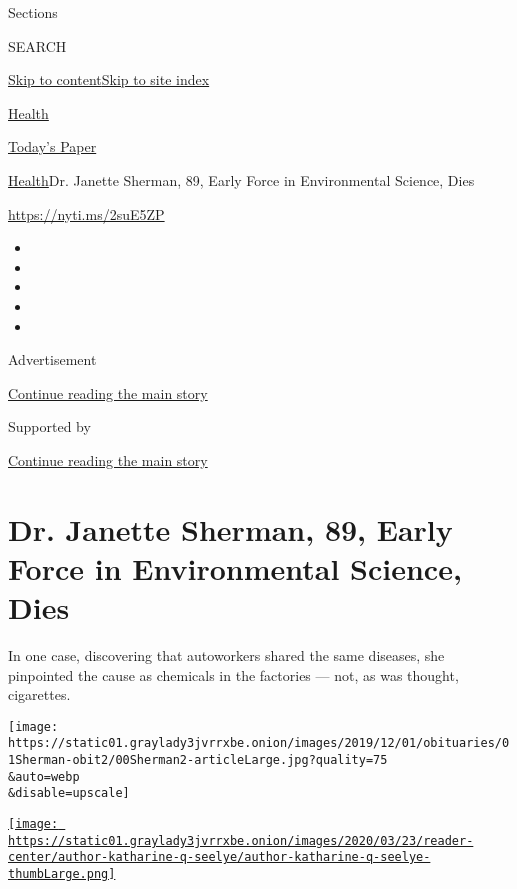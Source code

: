 Sections

SEARCH

\protect\hyperlink{site-content}{Skip to
content}\protect\hyperlink{site-index}{Skip to site index}

\href{https://www.nytimes3xbfgragh.onion/section/health}{Health}

\href{https://myaccount.nytimes3xbfgragh.onion/auth/login?response_type=cookie\&client_id=vi}{}

\href{https://www.nytimes3xbfgragh.onion/section/todayspaper}{Today's
Paper}

\href{/section/health}{Health}\textbar{}Dr. Janette Sherman, 89, Early
Force in Environmental Science, Dies

\url{https://nyti.ms/2suE5ZP}

\begin{itemize}
\item
\item
\item
\item
\item
\end{itemize}

Advertisement

\protect\hyperlink{after-top}{Continue reading the main story}

Supported by

\protect\hyperlink{after-sponsor}{Continue reading the main story}

\hypertarget{dr-janette-sherman-89-early-force-in-environmental-science-dies}{%
\section{Dr. Janette Sherman, 89, Early Force in Environmental Science,
Dies}\label{dr-janette-sherman-89-early-force-in-environmental-science-dies}}

In one case, discovering that autoworkers shared the same diseases, she
pinpointed the cause as chemicals in the factories --- not, as was
thought, cigarettes.

\texttt{[image: https://static01.graylady3jvrrxbe.onion/images/2019/12/01/obituaries/01Sherman-obit2/00Sherman2-articleLarge.jpg?quality=75\\\&auto=webp\\\&disable=upscale]}

\href{https://www.nytimes3xbfgragh.onion/by/katharine-q-seelye}{\texttt{[image: https://static01.graylady3jvrrxbe.onion/images/2020/03/23/reader-center/author-katharine-q-seelye/author-katharine-q-seelye-thumbLarge.png]}}

